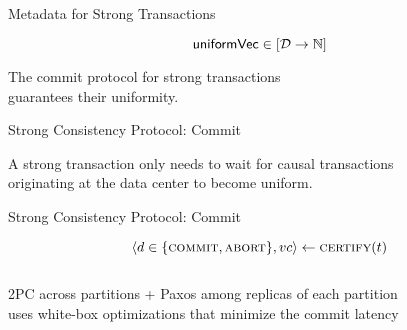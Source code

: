\begin{frame}{Metadata for Strong Transactions}
  \begin{center}
    \[
      {\sf uniformVec} \in [\mathcal{D} \to \mathbb{N}]
    \]


    \vspace{0.30cm}
    The commit protocol for strong transactions \\[3pt]
    guarantees their uniformity.
  \end{center}
\end{frame}

\begin{frame}{Strong Consistency Protocol: Commit}
  \begin{center}

    \vspace{0.50cm}
    A strong transaction only needs to wait for causal transactions \\[3pt]
    originating at the  data center to become uniform.
    \vspace{0.30cm}

  \end{center}
\end{frame}

\begin{frame}{Strong Consistency Protocol: Commit}
  \begin{center}
    \vspace{-0.30cm}
    \[
      \langle d \in \{\textsc{commit}, \textsc{abort}\}, vc \rangle \gets \textsc{certify}(t)
    \]

    \pause
    \begin{columns}
    \end{columns}

    \vspace{0.50cm}
    2PC across partitions + Paxos among replicas of each partition \\[3pt]
    uses white-box optimizations that minimize the commit latency
  \end{center}
\end{frame}
